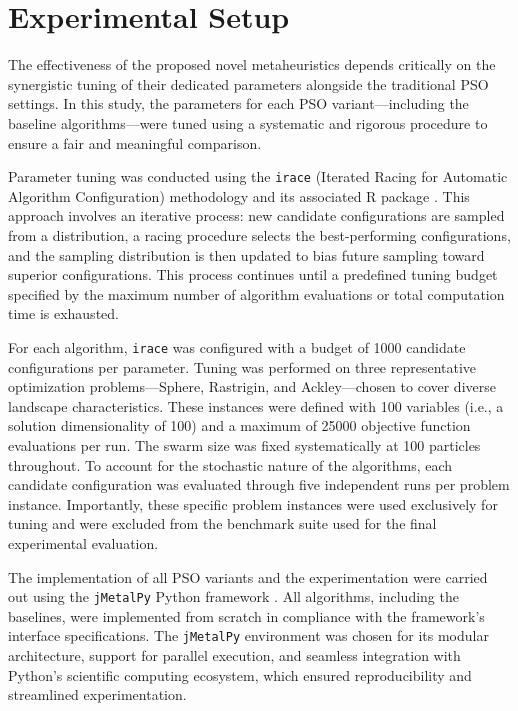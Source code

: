 {\section{Experimental Setup}


The effectiveness of the proposed novel \glspl{metaheuristic} depends critically on the synergistic tuning of their dedicated parameters alongside the traditional PSO settings. In this study, the parameters for each PSO variant---including the baseline algorithms---were tuned using a systematic and rigorous procedure to ensure a fair and meaningful comparison.

Parameter tuning was conducted using the \texttt{irace} (Iterated Racing for Automatic Algorithm Configuration) methodology and its associated R package \citep{lopezibanez2016irace}. This approach involves an iterative process: new candidate configurations are sampled from a distribution, a racing procedure selects the best-performing configurations, and the sampling distribution is then updated to bias future sampling toward superior configurations. This process continues until a predefined tuning budget specified by the maximum number of algorithm evaluations or total computation time is exhausted.

For each algorithm, \texttt{irace} was configured with a budget of 1000 candidate configurations per parameter. Tuning was performed on three representative optimization problems—Sphere, Rastrigin, and Ackley---chosen to cover diverse landscape characteristics. These instances were defined with 100 variables (i.e., a solution dimensionality of 100) and a maximum of 25000 objective function evaluations per run. The swarm size was fixed systematically at 100 particles throughout. To account for the stochastic nature of the algorithms, each candidate configuration was evaluated through five independent runs per problem instance. Importantly, these specific problem instances were used exclusively for tuning and were excluded from the benchmark suite used for the final experimental evaluation.

The implementation of all PSO variants and the experimentation were carried out using the \texttt{jMetalPy} Python framework \citep{benitezhidalgo2019jmetalpy}. All algorithms, including the baselines, were implemented from scratch in compliance with the framework’s interface specifications. The \texttt{jMetalPy} environment was chosen for its modular architecture, support for parallel execution, and seamless integration with Python’s scientific computing ecosystem, which ensured reproducibility and streamlined experimentation.

}
